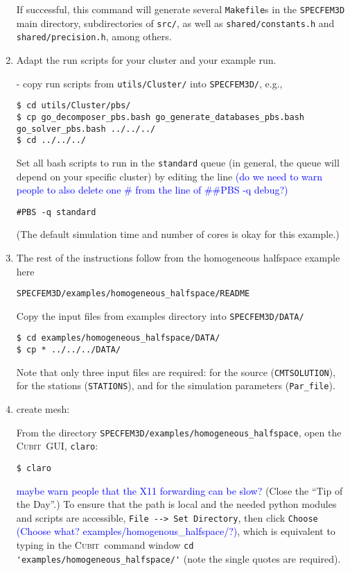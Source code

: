 \documentclass[10pt,fleqn,letterpaper]{article}
\newcommand{\cubit}{\textsc{Cubit}}
\newcommand{\blue}[1]{\textcolor{blue}{#1}}
\begin{document}
\begin{enumerate}
If successful, this command will generate several \verb+Makefile+s in the \verb+SPECFEM3D+ main directory,  subdirectories of \verb+src/+, as well as \verb+shared/constants.h+ and \verb+shared/precision.h+, among others.

\item Adapt the run scripts for your cluster and your example run.

- copy run scripts from \verb+utils/Cluster/+ into \verb+SPECFEM3D/+, e.g.,
\begin{lstlisting}
$ cd utils/Cluster/pbs/
$ cp go_decomposer_pbs.bash go_generate_databases_pbs.bash go_solver_pbs.bash ../../../
$ cd ../../../
\end{lstlisting}

Set all bash scripts to run in the \verb+standard+ queue (in general, the queue will depend on your specific cluster) by editing the line
\blue{(do we need to warn people to also delete one \# from the line of \#\#PBS -q debug?)}
\begin{lstlisting}
#PBS -q standard
\end{lstlisting}
(The default simulation time and number of cores is okay for this example.)
 
\item The rest of the instructions follow from the homogeneous halfspace example here
\begin{lstlisting}
SPECFEM3D/examples/homogeneous_halfspace/README
\end{lstlisting}

Copy the input files from examples directory into \verb+SPECFEM3D/DATA/+
\begin{lstlisting}
$ cd examples/homogeneous_halfspace/DATA/
$ cp * ../../../DATA/
\end{lstlisting}
%
Note that only three input files are required: for the source (\verb+CMTSOLUTION+), for the stations (\verb+STATIONS+), and for the simulation parameters (\verb+Par_file+).

\item create mesh:

From the directory \verb+SPECFEM3D/examples/homogeneous_halfspace+, open the \cubit\ GUI, \verb+claro+:
\begin{lstlisting}
$ claro
\end{lstlisting}
\blue{maybe warn people that the X11 forwarding can be slow?}
%
(Close the ``Tip of the Day''.)
To ensure that the path is local and the needed python modules and scripts are accessible, \verb+File --> Set Directory+, then click \verb+Choose+  \blue{(Choose what? examples/homogenous\_halfspace/?)}, which is equivalent to typing in the \cubit\ command window \verb+cd 'examples/homogeneous_halfspace/'+ (note the single quotes are required).


\end{enumerate}
\end{document}
